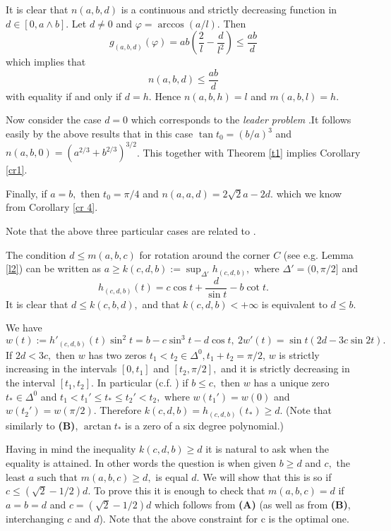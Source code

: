 \documentclass[12pt]{amsart}
\def\DD{\Delta}
\def\s{\smallskip}
\def\n{\noindent}
\def\w{\wedge}
\begin{document}
It is clear that $n(a,b,d)$ is a continuous and strictly
decreasing function in $d\in[0,a\w b].$ Let $d\neq 0$ and
$\varphi= \arccos (a/l). $ Then $$g_{(a,b,d)}(\varphi)=
ab\left(\frac{2}{l}-\frac{d}{l^2}\right)\le\frac{ab}{d} $$ which implies
that
\begin{equation}\label{7}
n(a,b,d)\le \frac{ab}{d}
\end{equation}
with equality if and only if $d=h$. Hence $n(a,b,h)=l$ and
$m(a,b,l)=h .$

Now consider the case $d=0$ which corresponds to the \emph{leader
problem} \cite{Ka} .It follows easily by the above results that in
this case $\tan t_0=(b/a)^3$ and
$n(a,b,0)=(a^{2/3}+b^{2/3})^{3/2}$. This together with Theorem
\ref{t1} implies Corollary \ref{cr1}.

Finally, if $a=b ,$ then $t_0=\pi/4$ and $n(a,a,d)=2\sqrt2a-2d.$
which we know from Corollary \ref{cr 4}.

Note that the above three particular cases are related to
\cite[Questions 2 and 6, p. 200]{Mo}.

\s

\n{\bf C.} The condition  $d\le m(a,b,c)$ for rotation around the
corner $C$ (see e.g. Lemma \ref{l2}) can be written as $a\ge
k(c,d,b):=\sup_{\DD'}h_{(c,d,b)},$ where $\DD'=(0,\pi/2]$ and
$$h_{(c,d,b)}(t)=c\cos t+\frac{d}{\sin t}-b\cot t.$$
It is clear that $d\le k(c,b,d),$ and that $k(c,d,b)<+\infty$ is
equivalent to $d\le b.$

We have
$$w(t):=h'_{(c,d,b)}(t)\sin^2t=b-c\sin^3t-d\cos t,\ 2w'(t)=\sin t(2d-3c\sin2t).$$
If $2d<3c,$ then $w$ has two zeros  $t_1<t_2\in \DD^0 ,
t_1+t_2=\pi/2$, $w$ is strictly increasing in the intervals
$[0,t_1]$ and $[t_2,\pi/2] ,$  and it is strictly decreasing in
the interval $[t_1,t_2].$ In particular (c.f. \cite{Mi}) if  $b\le
c ,$ then $w$ has a unique zero $t_\ast\in\DD^0$  and $t_1<t_1'\le
t_\ast\le t_2'<t_2,$ where $w(t_1')=w(0)$ and $w(t_2')=w(\pi/2)$.
Therefore $k(c,d,b)=h_{(c,d,b)}(t_\ast)\ge d.$ (Note that
similarly to \textbf{(B)}, $\arctan t_\ast$ is a zero of a six
degree polynomial.)

Having in mind the inequality $k(c,d,b)\ge d$ it is natural to ask
when the equality is attained. In other words the question is when
given $b\ge d$ and $c ,$ the least $a$ such that $m(a,b,c)\ge d,$
is equal $d.$ We will show that this is so if $c\le(\sqrt
2-1/2)d.$ To prove this it is enough to check that $m(a,b,c)=d$ if
$a=b=d$ and $c=(\sqrt 2-1/2)d $ which follows from \textbf{(A)}
(as well as from \textbf{(B)}, interchanging $c$ and $d$). Note
that the above constraint for c is the optimal one.
\end{document}
